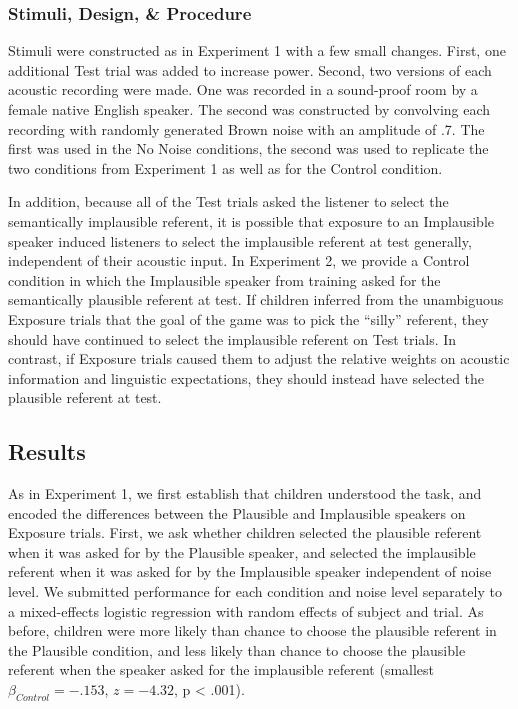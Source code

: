 \documentclass[man,floatsintext]{apa6}
\begin{document}
\subsubsection{Stimuli, Design, \& Procedure}

Stimuli were constructed as in Experiment 1 with a few small changes. First, one additional Test trial was added to increase power. Second, two versions of each acoustic recording were made. One was recorded in a sound-proof room by a female native English speaker. The second was constructed by convolving each recording with randomly generated Brown noise with an amplitude of .7. The first was used in the No Noise conditions, the second was used to replicate the two conditions from Experiment 1 as well as for the Control condition.

In addition, because all of the Test trials asked the listener to select the semantically implausible referent, it is possible that exposure to an Implausible speaker induced listeners to select the implausible referent at test generally, independent of their acoustic input.  In Experiment 2, we provide a Control condition in which the Implausible speaker from training asked for the semantically plausible referent at test. If children inferred from the unambiguous Exposure trials that the goal of the game was to pick the ``silly'' referent, they should have continued to select the implausible referent on Test trials. In contrast, if Exposure trials caused them to adjust the relative weights on acoustic information and linguistic expectations, they should instead have selected the plausible referent at test.

\subsection{Results}

As in Experiment 1, we first establish that children understood the task, and encoded the differences between the Plausible and Implausible speakers on Exposure trials. First, we ask whether children selected the plausible referent when it was asked for by the Plausible speaker, and selected the implausible referent when it was asked for by the Implausible speaker independent of noise level. We submitted performance for each condition and noise level separately to a mixed-effects logistic regression with random effects of subject and trial. As before, children were more likely than chance to choose the plausible referent in the Plausible condition, and less likely than chance to choose the plausible referent when the speaker asked for the implausible referent (smallest $\beta_{Control} = -.153$, $z = -4.32$, p < .001).
\end{document}
